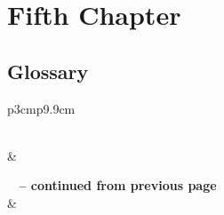 \documentclass[11pt]{report}
\begin{document}
\chapter{Fifth Chapter}
\section{Glossary}
\begin{longtable}{p{3cm}p{9.9cm}}
\caption[Glossary of Terms]{Glossary of Terms} 
\label{table:glossart} \\

\hline {} &  \\ \hline 
\endfirsthead

%
{{\bfseries \tablename\ \thetable{} -- continued from previous page}} \\
\hline {} &  \\ \hline 
\endhead

 \\ \hline
\endfoot


\end{longtable}
\end{document}
